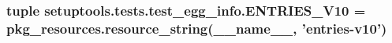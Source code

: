 \subsubsection[{E\+N\+T\+R\+I\+E\+S\+\_\+\+V10}]{\setlength{\rightskip}{0pt plus 5cm}tuple setuptools.\+tests.\+test\+\_\+egg\+\_\+info.\+E\+N\+T\+R\+I\+E\+S\+\_\+\+V10 = pkg\+\_\+resources.\+resource\+\_\+string(\+\_\+\+\_\+name\+\_\+\+\_\+, 'entries-\/v10')}\label{namespacesetuptools_1_1tests_1_1test__egg__info_ab3cb7d6983d3b90831a70566c756d64a}
